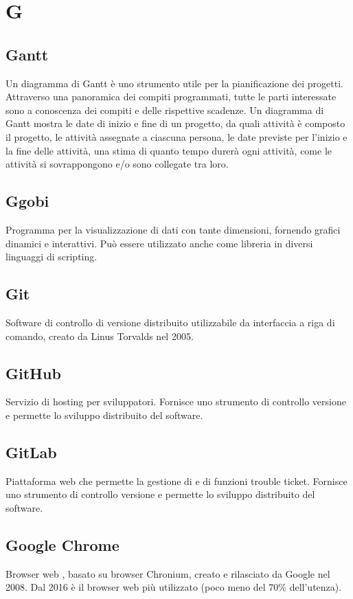 \section*{G}
\markright{}

\subsection*{Gantt}
Un diagramma di Gantt è uno strumento utile per la pianificazione dei progetti. Attraverso una panoramica dei compiti programmati, tutte le parti interessate sono a conoscenza dei compiti e delle rispettive scadenze. Un diagramma di Gantt mostra le date di inizio e fine di un progetto, da quali attività è composto il progetto, le attività assegnate a ciascuna persona, le date previste per l'inizio e la fine delle attività, una stima di quanto tempo durerà ogni attività, come le attività si sovrappongono e/o sono collegate tra loro.

\subsection*{Ggobi}
Programma  per la visualizzazione di dati con tante dimensioni, fornendo grafici dinamici e interattivi. Può essere utilizzato anche come libreria in diversi linguaggi di scripting.

\subsection*{Git}
Software di controllo di versione distribuito utilizzabile da interfaccia a riga di comando, creato da Linus Torvalds nel 2005. 

\subsection*{GitHub}
Servizio di hosting per sviluppatori. Fornisce uno strumento di controllo versione e permette lo sviluppo distribuito del software.

\subsection*{GitLab}
Piattaforma web che permette la gestione di   e di funzioni trouble ticket. Fornisce uno strumento di controllo versione e permette lo sviluppo distribuito del software.

\subsection*{Google Chrome}
Browser web , basato su browser Chronium, creato e rilasciato da Google nel 2008. Dal 2016 è il browser web più utilizzato (poco meno del 70\% dell'utenza).

